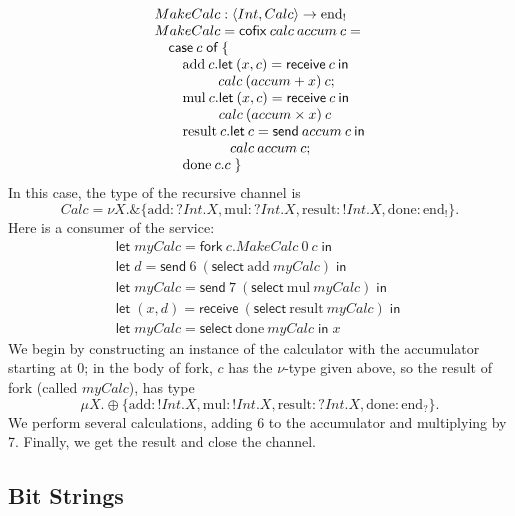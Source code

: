 \documentclass[orivec,envcountsame]{llncs}
\makeatletter
\newcommand{\with}{\mathbin\binampersand}
\newcommand{\gvout}[2]{{!#1.#2}}
\newcommand{\gvin}[2]{{?#1.#2}}
\newcommand{\uto}{\ensuremath{\rightarrow}}
\newcommand{\outterm}{\mathrm{end}_!}
\newcommand{\interm}{\mathrm{end}_?}
\newcommand{\mkwd}[1]{\mathsf{#1}}
\newcommand{\tkwd}[1]{\textsf{#1}}
\newcommand{\clabel}[1]{\mathrm{#1}}
\newcommand{\gvsend}[2]{\mkwd{send}\:#1\:#2}
\newcommand{\gvreceive}[1]{\mkwd{receive}\:#1}
\newcommand{\gvlet}[3]{\mkwd{let}\;#1 = #2\;\mkwd{in}\;#3}
\newcommand{\gvselect}[2]{\mkwd{select}\:#1\:#2}
\newcommand{\gvfork}[2]{\mkwd{fork}\:#1.#2}
\newcommand{\lrkwd}{\mkwd{cofix}}
\newcommand{\ba}{\begin{array}}
\newcommand{\ea}{\end{array}}
\newcommand{\bl}{\ba[t]{@{}l@{}}}
\newcommand{\el}{\ea}
\newcommand{\todo}[1]{{\noindent\small\color{red} \framebox{\parbox{\dimexpr\linewidth-2\fboxsep-2\fboxrule}{\textbf{TODO:} #1}}}}
\makeatother
\begin{document}
\[
\bl
MakeCalc : \langle Int, Calc \rangle \uto \outterm \\
MakeCalc = \lrkwd\:calc\:accum\:c = \\
\quad
  \bl
  \mkwd{case}\:c\;\mkwd{of}\:\{ \\
  \quad
    \bl
    \clabel{add}\:c. 
      \bl
      \mkwd{let}\:(x,c) = \gvreceive{c} \: \mkwd{in} \\
      calc\:(accum + x)\:c; \\
      \el \\
    \clabel{mul}\:c.
      \bl
      \mkwd{let}\:(x,c) = \gvreceive{c}\:\mkwd{in} \\
      calc\:(accum \times x)\:c \\
      \el \\
    \clabel{result}\:c. 
      \bl
      \mkwd{let}\:c = \gvsend{accum}{c}\:\mkwd{in} \\
      calc\:accum\:c; \\
      \el \\
    \clabel{done}\:c.c \; \}
    \el \\
  \el \\
\el
\]
In this case, the type of the recursive channel is
\[
 Calc = \nu X. \with \{ \clabel{add}: \gvin{Int}{X},
                        \clabel{mul}: \gvin{Int}{X},
                        \clabel{result}: \gvout{Int}{X},
                        \clabel{done}: \outterm \}.
\]%
Here is a consumer of the service:
\[\begin{array}{l}
  \gvlet{myCalc}{\gvfork{c}{MakeCalc\:0\:c}}{} \\
  \gvlet{d}{\gvsend{6}{(\gvselect{\clabel{add}}{myCalc})}}{} \\
  \gvlet{myCalc}{\gvsend{7}{(\gvselect{\clabel{mul}}{myCalc})}}{} \\
  \gvlet{(x,d)}{\gvreceive{(\gvselect{\clabel{result}}{myCalc})}}{} \\
  \gvlet{myCalc}{\gvselect{\clabel{done}}{myCalc}}{x}
\end{array}\]
We begin by constructing an instance of the calculator with the accumulator starting at 0; in the
body of \tkwd{fork}, $c$ has the $\nu$-type given above, so the result of \tkwd{fork} (called
$myCalc$), has type
\[
\mu X. \oplus \{ \clabel{add}: \gvout{Int}{X}, \clabel{mul}: \gvout{Int}{X}, \clabel{result}: \gvin{Int}{X}, \clabel{done}: \interm \}.
\]
We perform several calculations, adding 6 to the accumulator and multiplying by 7.  Finally, we get
the result and close the channel.

\subsection{Bit Strings}
%
\end{document}
